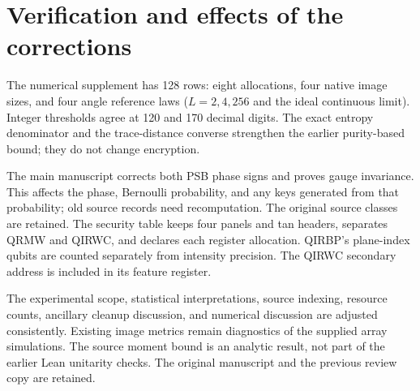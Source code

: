 \documentclass[11pt,a4paper]{article}
\begin{document}
\section{Verification and effects of the corrections}
The numerical supplement has 128 rows: eight allocations, four native
image sizes, and four angle reference laws ($L=2,4,256$ and the ideal
continuous limit). Integer thresholds agree at 120 and 170 decimal
digits. The exact entropy denominator and the trace-distance converse
strengthen the earlier purity-based bound; they do not change encryption.

The main manuscript corrects both PSB phase signs and proves gauge
invariance. This affects the phase, Bernoulli probability, and any
keys generated from that probability; old source records need
recomputation. The original source classes are retained.
The security table keeps four panels and tan headers, separates
QRMW and QIRWC, and declares each register allocation. QIRBP's
plane-index qubits are counted separately from intensity precision.
The QIRWC secondary address is included in its feature register.

The experimental scope, statistical interpretations, source indexing,
resource counts, ancillary cleanup discussion, and numerical discussion
are adjusted consistently. Existing image metrics remain diagnostics
of the supplied array simulations. The source moment bound is an
analytic result, not part of the earlier Lean unitarity checks.
The original manuscript and the previous review copy are retained.
\end{document}
